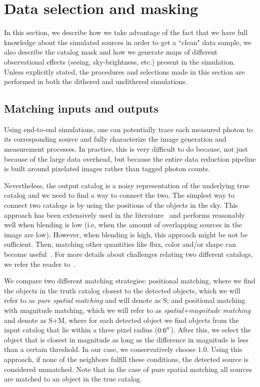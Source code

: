\documentclass[twocolumn]{aastex62}
\begin{document}
\section{Data selection and masking}
\label{sec:data_selection}
In this section, we describe how we take advantage of the fact that we have full knowledge about the simulated sources in order to get a ``clean" data sample, we also describe the catalog mask and how we generate maps of different observational effects (seeing, sky-brightness, etc.) present in the simulation. Unless explicitly stated, the procedures and selections made in this section are performed in both the dithered and undithered simulations.

\subsection{Matching inputs and outputs}
\label{ssec:matching}

Using end-to-end simulations, one can potentially trace each measured photon to its corresponding source and fully characterize the image generation and measurement processes. In practice, this is very difficult to do because, not just because  of the large data overhead, but because the entire data reduction pipeline is built around pixelated images rather than tagged photon counts.

Nevertheless, the output catalog is a noisy representation of the underlying true catalog and we need to find a way to connect the two. 
The simplest way to connect two catalogs is by using the positions of the objects in the sky. This approach has been extensively used in the literature~\citep{1977A&AS...28..211D,1983Obs...103..150B,1986MNRAS.223..279W} and performs reasonably well when blending is low (i.e, when the amount of overlapping sources in the image are low). However, when blending is high, this approach might be not be sufficient. Then, matching other quantities like flux, color and/or shape can become useful~\citep{2008ApJ...679..301B, doi:10.1146/annurev-statistics-010814-020231}. For more details about challenges relating two different catalogs, we refer the reader to~\citet{doi:10.1146/annurev-statistics-010814-020231}. 

We compare two different matching strategies: positional matching, where we find the objects in the truth catalog closest to the detected objects, which we will refer to as \textit{pure spatial matching} and will denote as \textsf{S}; and positional matching with magnitude matching, which we will refer to as \textit{spatial+magnitude matching} and denote as \textsf{S+M}, where for each detected object we find objects from the input catalog that lie within a three pixel radius ($0.6 \mbox{$^{\prime\prime}$}$). After this, we select the object that is closest in magnitude as long as the difference in magnitude is less than a certain threshold. In our case, we conservatively choose $1.0$. Using this approach, if none of the neighbors fulfill these conditions, the detected source is considered unmatched. Note that in the case of pure spatial matching all sources are matched to an object in the true catalog.
\end{document}
